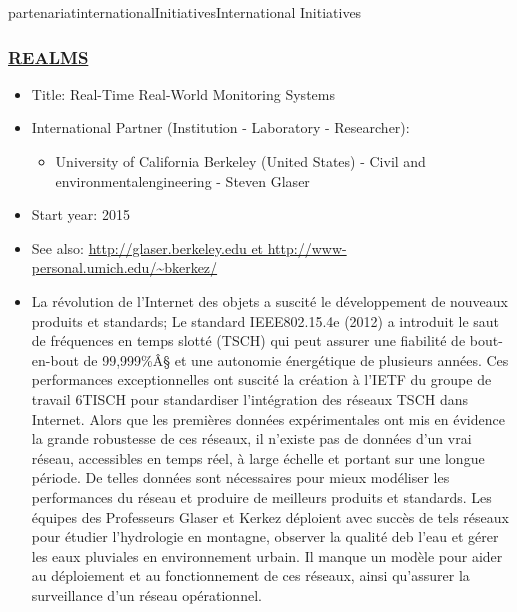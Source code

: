 \documentclass{ra2016}
\begin{document}
\begin{module}{partenariat}{internationalInitiatives}{International Initiatives}
\subsubsection{\href{http://glaser.berkeley.edu et http://www-personal.umich.edu/~bkerkez/}{REALMS }}
\begin{itemize}
 \item Title: Real-Time Real-World Monitoring Systems
 \item International Partner (Institution -  Laboratory - Researcher):
 \begin{itemize}
    \item University of California Berkeley (United States)  
 - Civil and environmentalengineering - Steven Glaser
 \end{itemize}
 \item Start year: 2015 \item See also: \url{http://glaser.berkeley.edu et http://www-personal.umich.edu/~bkerkez/}
 \item La révolution de l’Internet des objets a suscité le développement de nouveaux produits et standards; Le standard IEEE802.15.4e (2012) a introduit le saut de fréquences en temps slotté (TSCH) qui peut assurer une fiabilité de bout-en-bout de 99,999\%Â§ et une autonomie énergétique de plusieurs années. Ces performances exceptionnelles ont suscité la création à l’IETF du groupe de travail 6TISCH pour standardiser l’intégration des réseaux TSCH dans Internet. Alors que les premières données expérimentales ont mis en évidence la grande robustesse de ces réseaux, il n’existe pas de données d’un vrai réseau, accessibles en temps réel, à large échelle et portant sur une longue période. De telles données sont nécessaires pour mieux modéliser les performances du réseau et produire de meilleurs produits et standards. Les équipes des Professeurs Glaser et Kerkez déploient avec succès de tels réseaux pour étudier l’hydrologie en montagne, observer la qualité deb l’eau et gérer les eaux pluviales en environnement urbain. Il manque un modèle pour aider au déploiement et au fonctionnement de ces réseaux, ainsi qu’assurer la surveillance d’un réseau opérationnel. 
\end{itemize}



\end{module}
\end{document}
